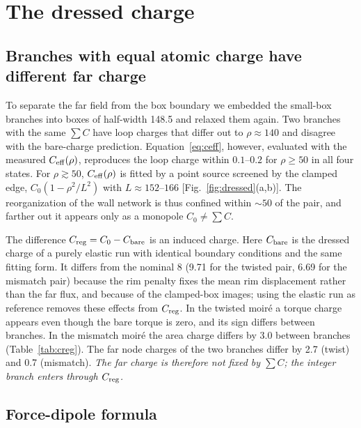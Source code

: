 \documentclass[prb,twocolumn,superscriptaddress,floatfix,10pt]{revtex4-2}
\begin{document}
\section{The dressed charge}\label{sec:dressed}

\subsection{Branches with equal atomic charge have different far charge}

To separate the far field from the box boundary we embedded the small-box branches into boxes of half-width 148.5 and relaxed them again. Two branches with the same $\sum C$ have loop charges that differ out to $\rho\approx140$ and disagree with the bare-charge prediction. Equation~\eqref{eq:ceff}, however, evaluated with the measured $C_{\rm eff}(\rho)$, reproduces the loop charge within $0.1$--$0.2$ for $\rho\ge50$ in all four states. For $\rho\gtrsim50$, $C_{\rm eff}(\rho)$ is fitted by a point source screened by the clamped edge, $C_0(1-\rho^2/L^2)$ with $L\approx152$--$166$ [Fig.~\ref{fig:dressed}(a,b)]. The reorganization of the wall network is thus confined within $\sim50$ of the pair, and farther out it appears only as a monopole $C_0\neq\sum C$.

The difference $C_{\rm reg}=C_0-C_{\rm bare}$ is an induced charge. Here $C_{\rm bare}$ is the dressed charge of a purely elastic run with identical boundary conditions and the same fitting form. It differs from the nominal $8$ (9.71 for the twisted pair, 6.69 for the mismatch pair) because the rim penalty fixes the mean rim displacement rather than the far flux, and because of the clamped-box images; using the elastic run as reference removes these effects from $C_{\rm reg}$. In the twisted moir\'e a torque charge appears even though the bare torque is zero, and its sign differs between branches. In the mismatch moir\'e the area charge differs by $3.0$ between branches (Table~\ref{tab:creg}). The far node charges of the two branches differ by 2.7 (twist) and 0.7 (mismatch). \emph{The far charge is therefore not fixed by $\sum C$; the integer branch enters through $C_{\rm reg}$.}

\subsection{Force-dipole formula}
\end{document}
